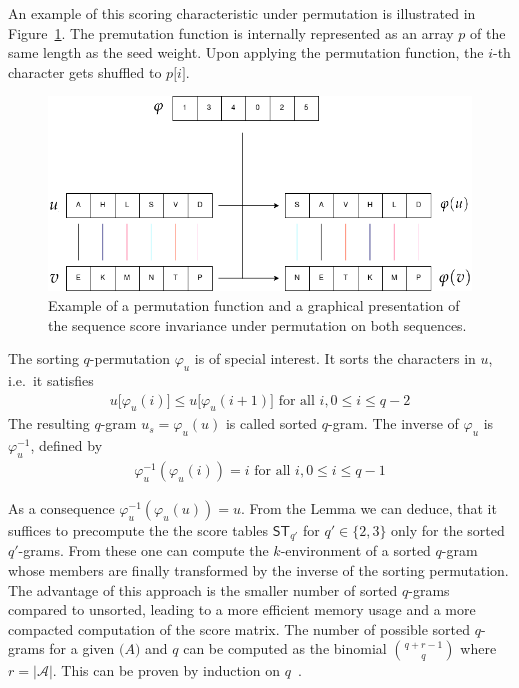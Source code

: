 \documentclass[twoside,a4paper,bsc]{master}
\newcommand{\Qgram}[1]{\(#1\)-gram}
\newcommand{\Subchar}[2]{#1\lbrack #2\rbrack}
\newcommand{\Permname}[1]{\varphi_{#1}}
\newcommand{\Perm}[2]{\Permname{#1}(#2)}
\newcommand{\Permnameinverse}[1]{\varphi_{#1}^{-1}}
\newcommand{\Perminverse}[2]{\Permnameinverse{#1}(#2)}
\newcommand{\Alpha}[0]{\mathcal{A}}
\begin{document}
An example of this scoring characteristic under permutation is illustrated
in
Figure~\ref{fig:shuffle}. The premutation function is internally
represented as
an
array \(p\) of the same length as the seed weight. Upon applying the
permutation
function, the \(i\)-th character gets shuffled to \(\Subchar{p}{i}\).
\begin{figure}[t]
\begin{center}
\includegraphics[scale=0.52]{graphics/shuffle.png}
\end{center}
\caption{Example of a permutation function and a graphical presentation of
the
sequence score invariance under permutation on both sequences.}
\label{fig:shuffle}
\end{figure}
The sorting \(q\)-permutation \(\varphi_{u}\) is of special interest.
It sorts the characters in \(u\), i.e.\ it satisfies
\begin{align}
\Subchar{u}{\Perm{u}{i}}\leq\Subchar{u}{\Perm{u}{i+1}}\text{ for all }i,
0\leq
i\leq q-2
\end{align}
The resulting \Qgram{q} \(u_s=\varphi_{u}(u)\) is called sorted \Qgram{q}.
The inverse of \(\varphi_{u}\) is \(\varphi_{u}^{-1}\), defined by
\begin{align}
\Perminverse{u}{\Perm{u}{i}}=i\text{ for all }i, 0\leq i\leq q-1
\end{align}

As a consequence \(\Perminverse{u}{\Perm{u}{u}}=u\).
From the Lemma we can deduce, that it suffices to precompute the
the score tables \(\mathsf{ST}_{q'}\) for \(q'\in\{2,3\}\)
only for the sorted \(q'\)-grams. From these one can compute
the \(k\)-environment of a sorted \(q\)-gram whose members are finally
transformed by the inverse of the sorting permutation.
The advantage of this approach is the smaller number of sorted \Qgram{q}s
compared to unsorted, leading to a more efficient memory usage and a more
compacted computation of the score matrix. The number of possible sorted 
\Qgram{q}s for a given \(\mathcal(A)\) and \(q\) can be computed as the binomial
\(\binom{q+r-1}{q}\) where \(r=|\Alpha|\). This can be proven by induction on 
\(q\)~\cite{pfn}.
\end{document}

